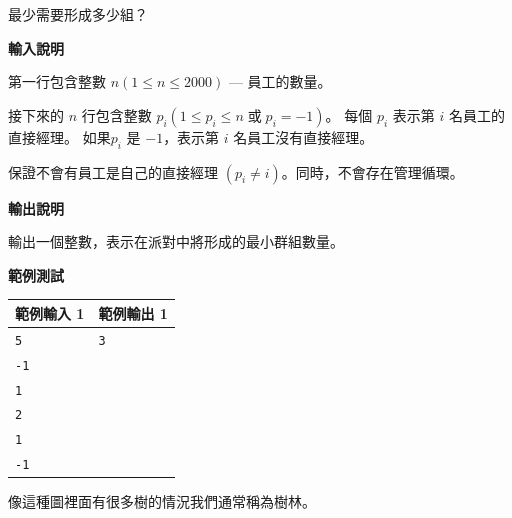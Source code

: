     最少需要形成多少組？

    \textbf{輸入說明}

    第一行包含整數 $n (1 \le n \le 2000)$ — 員工的數量。

    接下來的 $n$ 行包含整數 $p_i (1 \le p_i \le n \; 或 \; p_i = -1)$。
    每個 $p_i$ 表示第 $i$ 名員工的直接經理。
    如果$p_i$ 是 $-1$，表示第 $i$ 名員工沒有直接經理。

    保證不會有員工是自己的直接經理 $(p_i \ne i)$。同時，不會存在管理循環。
    
    \textbf{輸出說明}

    輸出一個整數，表示在派對中將形成的最小群組數量。

    \textbf{範例測試}

    \begin{tabular}{|m{7cm}|m{7cm}|}
        \hline
        範例輸入 1 & 範例輸出 1 \\
        \hline
        \verb|5|  & \verb|3| \\
        \verb|-1| & \\
        \verb|1|  & \\
        \verb|2|  & \\
        \verb|1|  & \\
        \verb|-1| & \\
        \hline
    \end{tabular}

    \begin{tip}
        像這種圖裡面有很多樹的情況我們通常稱為樹林。
    \end{tip}